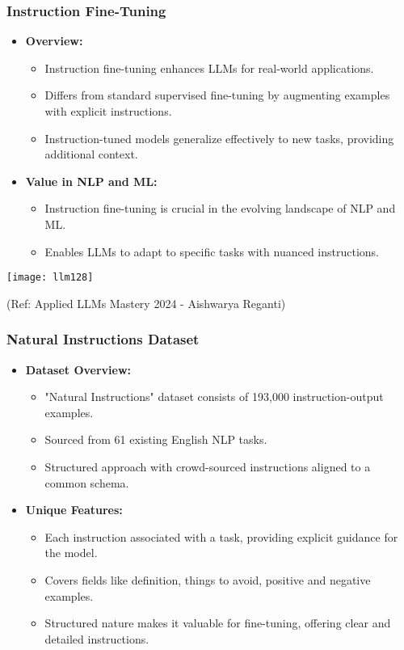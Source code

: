 \begin{frame}[fragile]\frametitle{Instruction Fine-Tuning}
  \begin{itemize}
    \item \textbf{Overview:}
      \begin{itemize}
        \item Instruction fine-tuning enhances LLMs for real-world applications.
        \item Differs from standard supervised fine-tuning by augmenting examples with explicit instructions.
        \item Instruction-tuned models generalize effectively to new tasks, providing additional context.
      \end{itemize}
    \item \textbf{Value in NLP and ML:}
      \begin{itemize}
        \item Instruction fine-tuning is crucial in the evolving landscape of NLP and ML.
        \item Enables LLMs to adapt to specific tasks with nuanced instructions.
      \end{itemize}	  
  \end{itemize}

\begin{center}
\texttt{[image: llm128]}
\end{center}				

{\tiny (Ref: Applied LLMs Mastery 2024 - Aishwarya Reganti)}

\end{frame}


\begin{frame}[fragile]\frametitle{Natural Instructions Dataset}
  \begin{itemize}
    \item \textbf{Dataset Overview:}
      \begin{itemize}
        \item "Natural Instructions" dataset consists of 193,000 instruction-output examples.
        \item Sourced from 61 existing English NLP tasks.
        \item Structured approach with crowd-sourced instructions aligned to a common schema.
      \end{itemize}
    \item \textbf{Unique Features:}
      \begin{itemize}
        \item Each instruction associated with a task, providing explicit guidance for the model.
        \item Covers fields like definition, things to avoid, positive and negative examples.
        \item Structured nature makes it valuable for fine-tuning, offering clear and detailed instructions.
      \end{itemize}
  \end{itemize}
\end{frame}


